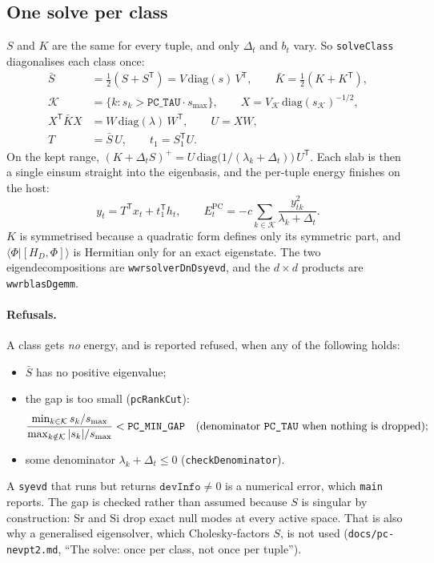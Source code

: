 \documentclass[11pt]{article}
\newcommand{\code}[1]{\texttt{#1}}
\newcommand{\cls}[1]{\ensuremath{\mathrm{#1}}}
\begin{document}
\subsection{One solve per class}
\label{sec:pcsolve}
$S$ and $K$ are the same for every tuple, and only $\Delta_t$ and $b_t$ vary.
So \code{solveClass} diagonalises each class once:
\begin{align}
  \bar S &= \tfrac12(S + S^{\mathsf T}) = V\,\mathrm{diag}(s)\,V^{\mathsf T},
    \qquad \bar K = \tfrac12(K + K^{\mathsf T}),
  \label{eq:pc-s}\\
  \mathcal K &= \{k : s_k > \code{PC\_TAU}\cdot s_{\max}\},\qquad
  X = V_{\mathcal K}\,\mathrm{diag}(s_{\mathcal K})^{-1/2},
  \label{eq:pc-cut}\\
  X^{\mathsf T}\bar K X &= W\,\mathrm{diag}(\lambda)\,W^{\mathsf T},
    \qquad U = XW,
  \label{eq:pc-k}\\
  T &= \bar S\,U, \qquad t_1 = S_1^{\mathsf T} U .
  \label{eq:pc-T}
\end{align}
On the kept range, $(K + \Delta_t S)^{+} = U\,\mathrm{diag}\bigl(1/(\lambda_k +
\Delta_t)\bigr)\,U^{\mathsf T}$. Each slab is then a single einsum straight
into the eigenbasis, and the per-tuple energy finishes on the host:
\begin{equation}
  y_t = T^{\mathsf T} x_t + t_1^{\mathsf T} h_t,\qquad
  E^{\mathrm{PC}}_t = -c \sum_{k\in\mathcal K} \frac{y_{tk}^2}{\lambda_k + \Delta_t}.
  \label{eq:pc-finish}
\end{equation}
$K$ is symmetrised because a quadratic form defines only its symmetric part,
and $\langle\Phi|[H_D,\Phi]\rangle$ is Hermitian only for an exact eigenstate.
The two eigendecompositions are \code{wwrsolverDnDsyevd}, and the $d\times d$
products are \code{wwrblasDgemm}.

\paragraph{Refusals.} A class gets \emph{no} energy, and is reported refused,
when any of the following holds:
\begin{itemize}
\item $\bar S$ has no positive eigenvalue;
\item the gap is too small (\code{pcRankCut}):
  \begin{equation}
  \frac{\min_{k\in\mathcal K} s_k/s_{\max}}
       {\max_{k\notin\mathcal K} |s_k|/s_{\max}} < \code{PC\_MIN\_GAP}
  \quad\text{(denominator \code{PC\_TAU} when nothing is dropped);}
  \label{eq:gap}
  \end{equation}
\item some denominator $\lambda_k + \Delta_t \le 0$ (\code{checkDenominator}).
\end{itemize}
A \code{syevd} that runs but returns $\code{devInfo}\ne 0$ is a numerical
error, which \code{main} reports. The gap is checked rather than assumed
because $S$ is singular by construction: \cls{Sr} and \cls{Si} drop exact null
modes at every active space. That is also why a generalised eigensolver,
which Cholesky-factors $S$, is not used (\code{docs/pc-nevpt2.md}, ``The
solve: once per class, not once per tuple'').
\end{document}
